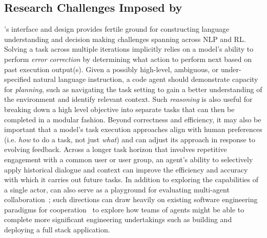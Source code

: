 \subsection{Research Challenges Imposed by \benchmark{}}
\label{sec:benchmark:challenges}
\benchmark{}'s interface and design provides fertile ground for constructing language understanding and decision making challenges spanning across NLP and RL.
Solving a task across multiple iterations implicitly relies on a model's ability to perform \textit{error correction} by determining what action to perform next based on past execution output(s).
Given a possibly high-level, ambiguous, or under-specified natural language instruction, a code agent should demonstrate capacity for \textit{planning}, such as navigating the task setting to gain a better understanding of the environment and identify relevant context.
Such \textit{reasoning} is also useful for breaking down a high level objective into separate tasks that can then be completed in a modular fashion.
Beyond correctness and efficiency, it may also be important that a model's task execution approaches align with human preferences (i.e. \textit{how} to do a task, not just \textit{what}) and can adjust its approach in response to evolving feedback. Across a longer task horizon that involves repetitive engagement with a common user or user group, an agent's ability to selectively apply historical dialogue and context can improve the efficiency and accuracy with which it carries out future tasks. In addition to exploring the capabilities of a single actor, \benchmark{} can also serve as a playground for evaluating multi-agent collaboration~\cite{havrylov2017emergence, wong2022deep}; such directions can draw heavily on existing software engineering paradigms for cooperation~\cite{dingsoyr2012decade, williams2000strengthening} to explore how teams of agents might be able to complete more significant engineering undertakings such as building and deploying a full stack application. 